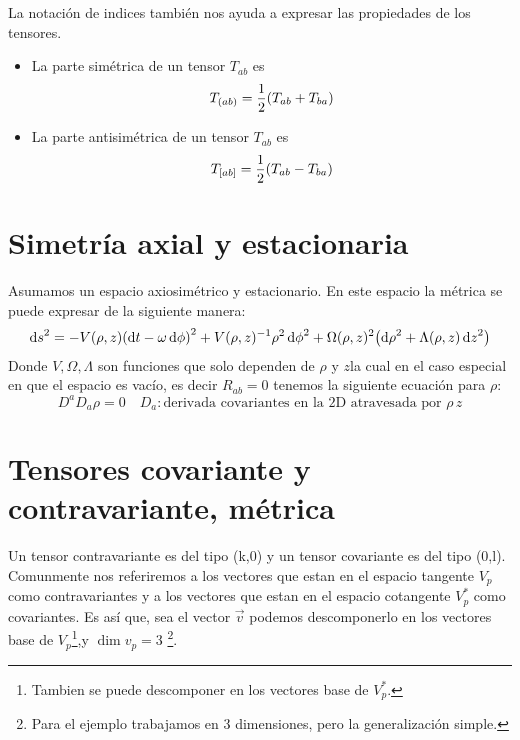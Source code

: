 \documentclass[../Main.tex]{subfiles}
\begin{document}
La notación de indices también nos ayuda a expresar las propiedades de los tensores.
\begin{itemize}
    \item La parte simétrica de un tensor $T_{ab}$ es
    \begin{equation}
        T_{(ab)}=\dfrac{1}{2}\qty(T_{ab}+T_{ba})
    \end{equation}
    \item La parte antisimétrica de un tensor $T_{ab}$ es
    \begin{equation}
        T_{[ab]}=\dfrac{1}{2}\qty(T_{ab}-T_{ba})
    \end{equation}
\end{itemize}

\section{Simetría axial y estacionaria}

Asumamos un espacio axiosimétrico y estacionario. En este espacio la métrica se puede expresar de la siguiente manera:
%
\begin{equation}
\dd{s}^{2} = -V(\rho, z)\qty(\dd{t}-\omega\dd{\phi})^{2}+V(\rho, z)^{-1}\rho^{2}\dd{\phi}^{2}+\Omega(\rho, z)^{2}\qty(\dd{\rho}^{2}+\Lambda(\rho, z)\dd{z}^{2})
\end{equation}
%
Donde $V,\Omega, \Lambda$ son funciones que solo dependen de $\rho$ y $z$la cual en el caso especial en que el espacio es vacío, es decir $R_{ab}=0$ tenemos la siguiente ecuación para $\rho$:
%
\begin{equation}
    D^{a}D_{a}\rho=0 \quad D_{a}: \text{derivada covariantes en la 2D atravesada por } \rho \, z
\end{equation}
%

\section{Tensores covariante y contravariante, métrica}\label{sec:tensores}
Un tensor contravariante es del tipo (k,0) y un tensor covariante es del tipo (0,l). Comunmente nos referiremos a los vectores que estan en el espacio tangente $V_{p}$ como contravariantes y a los vectores que estan en el espacio cotangente $V^{*}_{p}$ como covariantes. Es así que, sea el vector $\vec{v}$ podemos descomponerlo en los vectores base de $V_{p}$\footnote{Tambien se puede descomponer en los vectores base de $V^{*}_{p}$.},y $\dim{v_{p}}=3$ \footnote{Para el ejemplo trabajamos en 3 dimensiones, pero la generalización simple.}.
\end{document}
